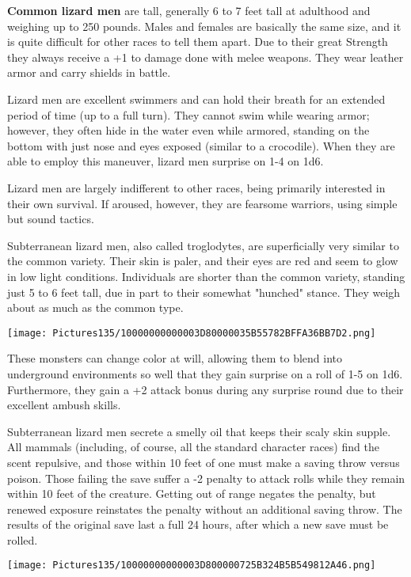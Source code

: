 \documentclass[a4paper,twoside,openany,10pt]{book}
\begin{document}
\begin{multicols}{2}
\textbf{Common lizard men }are tall, generally 6 to 7 feet tall at adulthood and weighing up to 250 pounds. Males and females are basically the same size, and it is quite difficult for other races to tell them apart. Due to their great Strength they always receive a +1 to damage done with melee weapons. They wear leather armor and carry shields in battle.

Lizard men are excellent swimmers and can hold their breath for an extended period of time (up to a full turn). They cannot swim while wearing armor; however, they often hide in the water even while armored, standing on the bottom with just nose and eyes exposed (similar to a crocodile). When they are able to employ this maneuver, lizard men surprise on 1-4 on 1d6.

Lizard men are largely indifferent to other races, being primarily interested in their own survival. If aroused, however, they are fearsome warriors, using simple but sound tactics. 

Subterranean lizard men, also called troglodytes, are superficially very similar to the common variety. Their skin is paler, and their eyes are red and seem to glow in low light conditions. Individuals are shorter than the common variety, standing just 5 to 6 feet tall, due in part to their somewhat "hunched" stance. They weigh about as much as the common type.


\begin{center} \texttt{[image: Pictures135/10000000000003D80000035B55782BFFA36BB7D2.png]} \end{center}


These monsters can change color at will, allowing them to blend into underground environments so well that they gain surprise on a roll of 1-5 on 1d6. Furthermore, they gain a +2 attack bonus during any surprise round due to their excellent ambush skills.

Subterranean lizard men secrete a smelly oil that keeps their scaly skin supple. All mammals (including, of course, all the standard character races) find the scent repulsive, and those within 10 feet of one must make a saving throw versus poison. Those failing the save suffer a -2 penalty to attack rolls while they remain within 10 feet of the creature. Getting out of range negates the penalty, but renewed exposure reinstates the penalty without an additional saving throw. The results of the original save last a full 24 hours, after which a new save must be rolled.

\begin{center} \texttt{[image: Pictures135/10000000000003D800000725B324B5B549812A46.png]} \end{center}



\end{multicols}
\end{document}
